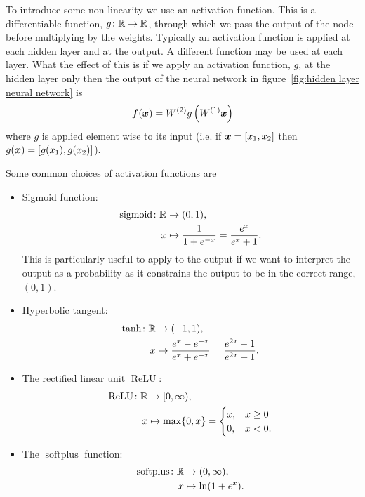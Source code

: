 \documentclass[a4paper]{article}
\begin{document}
    To introduce some non-linearity we use an activation function.
    This is a differentiable function, \(g\colon\mathbb{R}\to\mathbb{R}\), through which we pass the output of the node before multiplying by the weights.
    Typically an activation function is applied at each hidden layer and at the output.
    A different function may be used at each layer.
    What the effect of this is if we apply an activation function, \(g\), at the hidden layer only then the output of the neural network in figure~\ref{fig:hidden layer neural network} is
    \[\bm{f}(\bm{x}) = W^{(2)}g\left(W^{(1)}\bm{x}\right)\]
    where \(g\) is applied element wise to its input (i.e. if \(\bm{x} = [x_1, x_2]\) then \(g(\bm{x}) = [g(x_1), g(x_2)]\)).
    
    Some common choices of activation functions are
    \begin{itemize}
        \item Sigmoid function:
        \begin{align*}
            \operatorname{sigmoid}\colon\mathbb{R}&\to(0, 1),\\
            x&\mapsto \frac{1}{1 + e^{-x}} = \frac{e^x}{e^x + 1}.
        \end{align*}
        This is particularly useful to apply to the output if we want to interpret the output as a probability as it constrains the output to be in the correct range, \((0, 1)\).
        \item Hyperbolic tangent:
        \begin{align*}
            \tanh\colon\mathbb{R}&\to(-1, 1),\\
            x&\mapsto\frac{e^x - e^{-x}}{e^x + e^{-x}} = \frac{e^{2x} - 1}{e^{2x} + 1}.
        \end{align*}
        \item The rectified linear unit \(\operatorname{ReLU}\):
        \begin{align*}
            \operatorname{ReLU}\colon\mathbb{R}&\to[0, \infty),\\
            x&\mapsto\max\{0, x\} =
            \begin{cases}
                x, & x \ge 0\\
                0, & x < 0.
            \end{cases}
        \end{align*}
        \item The \(\operatorname{softplus}\) function:
        \begin{align*}
            \operatorname{softplus}\colon\mathbb{R}&\to(0, \infty),\\
            x&\mapsto\ln(1 + e^x).
        \end{align*}
    \end{itemize}
\end{document}
